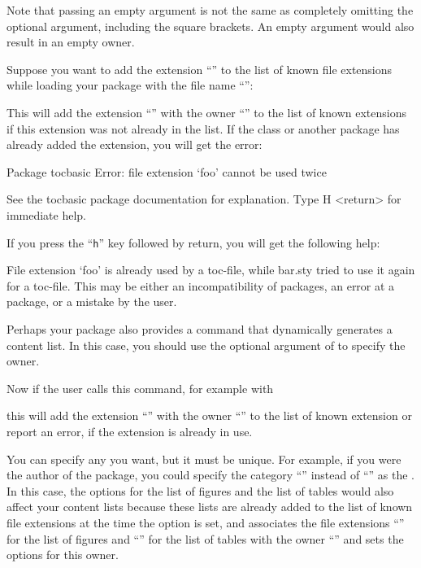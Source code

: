 Note that passing an empty  argument is not
the same as completely omitting the optional argument, including the square
brackets. An empty argument would also result in an empty owner.
\begin{Example}
  Suppose you want to add the extension ``'' to the list of known
  file extensions while loading your package with the file name
  ``'':
\begin{lstcode}
\end{lstcode}%
  This will add the extension ``'' with the owner
  ``'' to the list of known extensions if this extension was
  not already in the list. If the class or another package has already added
  the extension, you will get the error:
\begin{lstoutput}
  Package tocbasic Error: file extension `foo' cannot be used twice

  See the tocbasic package documentation for explanation.
  Type  H <return>  for immediate help.
\end{lstoutput}
  If you press the ``\texttt{h}'' key followed by return, you will get the
  following help:
\begin{lstoutput}
  File extension `foo' is already used by a toc-file, while bar.sty
  tried to use it again for a toc-file.
  This may be either an incompatibility of packages, an error at a package,
  or a mistake by the user.
\end{lstoutput}

  Perhaps your package also provides a command that dynamically generates a
  content list. In this case, you should use the optional argument of
   to specify the owner.
\begin{lstcode}
  \newcommand*{\createnewlistofsomething}[1]{%
    \addtotoclist[bar.sty]{#1}%
  }
\end{lstcode}
  Now if the user calls this command, for example with
\begin{lstcode}
\end{lstcode}
  this will add the extension ``'' with the owner
  ``'' to the list of known extension or report an error, if
  the extension is already in use.
\end{Example}
You can specify any  you want, but it must be unique. For
example, if you were the author of the  package, you could
specify the category ``'' instead of ``'' as
the . In this case, the \KOMAScript{}
options%
 for the list of figures and the list of
tables would also affect your content lists because these lists are already
added to the list of known file extensions at the time the option is set, and
\KOMAScript{} associates the file extensions ``'' for the list of
figures and ``'' for the list of tables with the owner
``'' and sets the options for this owner.

